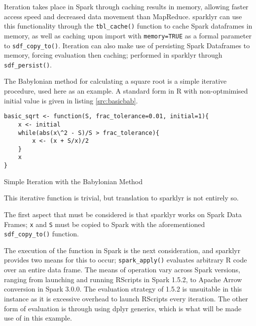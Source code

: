 \documentclass[10pt,a4paper]{article}
\begin{document}
Iteration takes place in Spark through caching results in memory, allowing
faster access speed and decreased data movement than
MapReduce\cite{zaharia2010spark}.
sparklyr can use this functionality through the \texttt{tbl\_cache()} function
to cache Spark dataframes in memory, as well as caching upon import with
\texttt{memory=TRUE} as a formal parameter to \texttt{sdf\_copy\_to()}. 
Iteration can also make use of persisting Spark Dataframes to memory, forcing
evaluation then caching; performed in sparklyr through \texttt{sdf\_persist()}.

The Babylonian method for calculating a square root is a simple iterative
procedure, used here as an example.
A standard form in R with non-optmimised initial value is given in listing
\ref{src:basicbab}.

\begin{listing}
\begin{verbatim}
basic_sqrt <- function(S, frac_tolerance=0.01, initial=1){
	x <- initial
	while(abs(x\^2 - S)/S > frac_tolerance){
		x <- (x + S/x)/2
	}
	x
}
\end{verbatim}
\caption{Simple Iteration with the Babylonian Method}\label{src:basicbab}
\end{listing}

This iterative function is trivial, but translation to sparklyr is not entirely so.

The first aspect that must be considered is that sparklyr works on Spark Data
Frames;
\texttt{x} and \texttt{S} must be copied to Spark with the aforementioned
\texttt{sdf\_copy\_to()} function.

The execution of the function in Spark is the next consideration, and sparklyr
provides two means for this to occur;
\texttt{spark\_apply()} evaluates arbitrary R code over an entire data frame.
The means of operation vary across Spark versions, ranging from launching and
running RScripts in Spark 1.5.2, to Apache Arrow conversion in Spark 3.0.0. 
The evaluation strategy of 1.5.2 is unsuitable in this instance as it is
excessive overhead to launch RScripts every iteration. 
The other form of evaluation is through using dplyr generics, which is what
will be made use of in this example.
\end{document}
